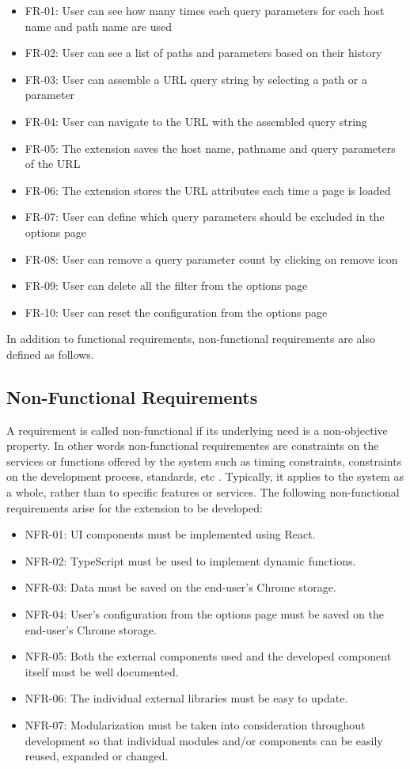 \begin{itemize}
  \item FR-01: User can see how many times each query parameters for each host name and path name are used
  \item FR-02: User can see a list of paths and parameters based on their history
  \item FR-03: User can assemble a URL query string by selecting a path or a parameter
  \item FR-04: User can navigate to the URL with the assembled query string
  \item FR-05: The extension saves the host name, pathname and query parameters of the URL
  \item FR-06: The extension stores the URL attributes each time a page is loaded
  \item FR-07: User can define which query parameters should be excluded in the options page
  \item FR-08: User can remove a query parameter count by clicking on remove icon
  \item FR-09: User can delete all the filter from the options page
  \item FR-10: User can reset the configuration from the options page
\end{itemize}

In addition to functional requirements, non-functional requirements are also defined as follows.

\subsection{Non-Functional Requirements}
A requirement is called non-functional if its underlying need is a non-objective property. In other words non-functional requirementes are constraints on the services or functions offered by the system such as timing constraints, constraints on the development process, standards, etc \autocite{sommerville2011software}. Typically, it applies to the system as a whole, rather than to specific features or services. The following non-functional requirements arise for the extension to be developed:

\begin{itemize}
  \item NFR-01: UI components must be implemented using React.
  \item NFR-02: TypeScript must be used to implement dynamic functions.
  \item NFR-03: Data must be saved on the end-user's Chrome storage.
  \item NFR-04: User's configuration from the options page must be saved on the end-user's Chrome storage.
  \item NFR-05: Both the external components used and the developed component itself must be well documented.
  \item NFR-06: The individual external libraries must be easy to update.
  \item NFR-07: Modularization must be taken into consideration throughout development so that individual modules and/or components can be easily reused, expanded or changed.
\end{itemize}

